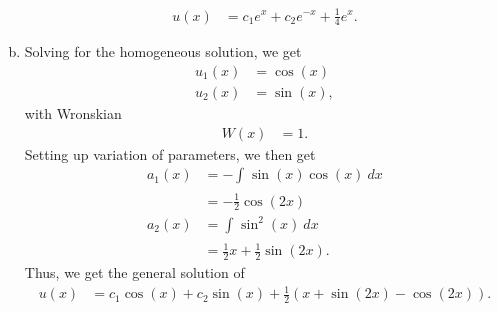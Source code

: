 \documentclass[10pt]{mypackage}
\begin{document}
\begin{solution}[39.7]
\begin{enumerate}[(a)]
\begin{align*}
        u(x) &= c_1e^{x} + c_2e^{-x} + \frac{1}{4}e^{x}.
      \end{align*}
    \item Solving for the homogeneous solution, we get
      \begin{align*}
        u_1(x) &= \cos(x)\\
        u_2(x) &= \sin(x),
      \end{align*}
      with Wronskian
      \begin{align*}
        W(x) &= 1.
      \end{align*}
      Setting up variation of parameters, we then get
      \begin{align*}
        a_1(x) &= - \int_{}^{} \sin(x)\cos(x)\:dx\\
               &= -\frac{1}{2}\cos\left( 2x \right)\\
        a_2(x) &= \int_{}^{} \sin^2(x)\:dx\\
               &= \frac{1}{2}x + \frac{1}{2}\sin\left( 2x \right).
      \end{align*}
      Thus, we get the general solution of
      \begin{align*}
        u(x) &= c_1\cos(x) + c_2\sin(x) + \frac{1}{2}\left( x + \sin(2x) - \cos(2x) \right).
      \end{align*}
  \end{enumerate}
\end{solution}
\end{document}

